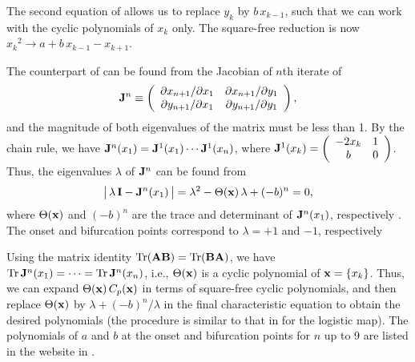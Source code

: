 \documentclass{ws-ijbc}
\begin{document}
The second equation of 
allows us to replace $y_k$ by $b \, x_{k-1}$,
  such that we can work with the cyclic polynomials of $x_k$ only.
The square-free reduction is now
  ${x_k}^2 \rightarrow a + b \, x_{k-1} - x_{k+1}$.



The counterpart of 
  can be found from the Jacobian of $n$th iterate of 
\[
  \mathbf{J}^n
  \equiv
  \left(
    \begin{array}{ccc}
      \partial x_{n+1}/\partial x_1 & \partial x_{n+1}/\partial y_1 \\
      \partial y_{n+1}/\partial x_1 & \partial y_{n+1}/\partial y_1 \\
    \end{array}
  \right),
\]
and the magnitude of both eigenvalues of the matrix must be less than 1.
By the chain rule, we have
  $\mathbf{J}^n (x_1) = \mathbf{J}^1(x_1) \cdots \mathbf{J}^1(x_n)$,
  where
$\mathbf{J}^1(x_k)
  =
  \left(
    \begin{array}{cc}
      -2 x_k & 1 \\
      b & 0
    \end{array}
  \right)$.
Thus, the eigenvalues $\lambda$ of $\mathbf{J}^n$ can be found from
%
\begin{equation}
\big|\, \lambda \, \mathbf{I} - \mathbf{J}^n(x_1) \,\big|
  = \lambda^2 - \Theta(\mathbf{x}) \,\lambda +(-b)^n = 0,
\label{eq:henonder}
\end{equation}
%
where $\Theta(\mathbf{x})$ and $(-b)^n$
  are the trace and determinant of $\mathbf{J}^n(x_1)$,
  respectively \cite{hitzl}.
The onset and bifurcation points
  correspond to $\lambda = +1$ and $-1$, respectively



Using the matrix identity $\mathrm{Tr}( \mathbf{A} \mathbf{B}) = \mathrm{Tr}(\mathbf{B} \mathbf{A})$,
  we have
    $\mathrm{Tr} \, \mathbf{J}^n(x_1) = \cdots = \mathrm{Tr} \, \mathbf{J}^n(x_n)$,
i.e., $\Theta(\mathbf{x})$ is a cyclic polynomial of $\mathbf{x} = \{ x_k \}$.
%
Thus, we can expand $\Theta(\mathbf{x}) \, C_p(\mathbf{x})$
  in terms of square-free cyclic polynomials,
  and then replace $\Theta(\mathbf{x})$ by $\lambda + (-b)^n/\lambda$
  in the final characteristic equation to obtain the desired polynomials
  (the procedure is similar to that in  for the logistic map).
%
%
%
The polynomials of $a$ and $b$
  at the onset and bifurcation points for $n$ up to 9
  are listed in the website in .
\end{document}
